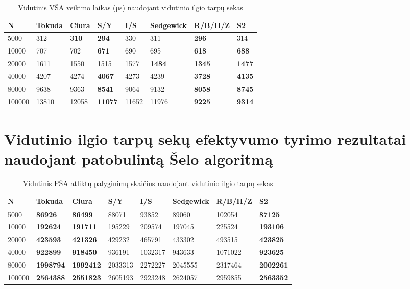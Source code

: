 \documentclass{VUMIFInfKursinis}
\begin{document}
\begin{table}[H]
  \caption{Vidutinis VŠA veikimo laikas (μs) naudojant vidutinio ilgio tarpų sekas}
  \label{tss_medium_runtimes}
  \begin{tabular}{|l|l|l|l|l|l|l|l|}
  \hline
  N      & Tokuda & Ciura        & S/Y            & I/S   & Sedgewick     & R/B/H/Z       & S2            \\ \hline
  5000   & 312    & \textbf{310} & \textbf{294}   & 330   & 311           & \textbf{296}  & 314           \\ \hline
  10000  & 707    & 702          & \textbf{671}   & 690   & 695           & \textbf{618}  & \textbf{688}  \\ \hline
  20000  & 1611   & 1550         & 1515           & 1577  & \textbf{1484} & \textbf{1345} & \textbf{1477} \\ \hline
  40000  & 4207   & 4274         & \textbf{4067}  & 4273  & 4239          & \textbf{3728} & \textbf{4135} \\ \hline
  80000  & 9638   & 9363         & \textbf{8541}  & 9064  & 9132          & \textbf{8058} & \textbf{8745} \\ \hline
  100000 & 13810  & 12058        & \textbf{11077} & 11652 & 11976         & \textbf{9225} & \textbf{9314} \\ \hline
  \end{tabular}
\end{table}

\section{Vidutinio ilgio tarpų sekų efektyvumo tyrimo rezultatai naudojant patobulintą Šelo algoritmą}

\begin{table}[H]
  \caption{Vidutinis PŠA atliktų palyginimų skaičius naudojant vidutinio ilgio tarpų sekas}
  \label{iss_medium_comparisons}
  \begin{tabular}{|l|l|l|l|l|l|l|l|}
  \hline
  N      & Tokuda           & Ciura            & S/Y     & I/S     & Sedgewick & R/B/H/Z & S2               \\ \hline
  5000   & \textbf{86926}   & \textbf{86499}   & 88071   & 93852   & 89060     & 102054  & \textbf{87125}   \\ \hline
  10000  & \textbf{192624}  & \textbf{191711}  & 195229  & 209574  & 197045    & 225524  & \textbf{193106}  \\ \hline
  20000  & \textbf{423593}  & \textbf{421326}  & 429232  & 465791  & 433302    & 493515  & \textbf{423825}  \\ \hline
  40000  & \textbf{922899}  & \textbf{918450}  & 936191  & 1032317 & 943633    & 1071022 & \textbf{923625}  \\ \hline
  80000  & \textbf{1998794} & \textbf{1992412} & 2033313 & 2272227 & 2045555   & 2317464 & \textbf{2002261} \\ \hline
  100000 & \textbf{2564388} & \textbf{2551823} & 2605193 & 2923248 & 2624057   & 2959855 & \textbf{2563352} \\ \hline
  \end{tabular}
\end{table}
\end{document}
